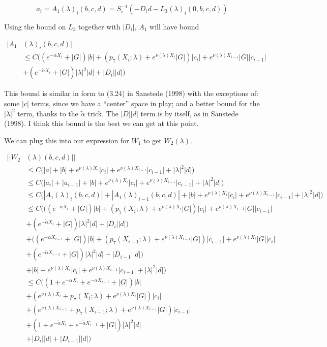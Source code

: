 \documentclass[12pt]{article}
\begin{document}
\begin{enumerate}
\[
a_i = A_1(\lambda)_i(b, c, d) = S_i^{-1}(-D_i d - L_3(\lambda)_i(0, b, c, d))
\]

Using the bound on $L_3$ together with $|D_i|$, $A_1$ will have bound

\begin{align*}
|A_1&(\lambda)_i(b, c, d)| \\
&\leq C \Big( (e^{-\alpha X_i} + |G|) |b| 
+ ( p_7(X_i; \lambda) + e^{\nu(\lambda)X_i} |G|) |c_i| + e^{\nu(\lambda)X_{i-1}} |G| |c_{i-1}| \\
&+ (e^{-\tilde{\alpha} X_i} + |G|) |\lambda|^2 |d| + |D_i||d| \Big)
\end{align*} 

This bound is similar in form to (3.24) in Sanstede (1998) with the exceptions of: some $|c|$ terms, since we have a ``center'' space in play; and a better bound for the $|\lambda|^2$ term, thanks to the $\tilde{\alpha}$ trick. The $|D| |d| $ term is by itself, as in Sanstede (1998). I think this bound is the best we can get at this point.

We can plug this into our expression for $W_1$ to get $W_2(\lambda)$.

\begin{align*}
||W_2&(\lambda)(b,c,d)|| \\
&\leq C \Big(|a| + |b| + e^{\nu(\lambda)X_i}|c_i| + e^{\nu(\lambda)X_{i-1}}|c_{i-1}| + |\lambda|^2 |d| \Big) \\
&\leq C \Big(|a_i| + |a_{i-1}| + |b| + e^{\nu(\lambda)X_i}|c_i| + e^{\nu(\lambda)X_{i-1}}|c_{i-1}| + |\lambda|^2 |d| \Big) \\
&\leq C \Big(|A_1(\lambda)_i(b,c,d)| + |A_1(\lambda)_{i-1}(b,c,d)| + |b| + e^{\nu(\lambda)X_i}|c_i| + e^{\nu(\lambda)X_{i-1}}|c_{i-1}| + |\lambda|^2 |d| \Big) \\
&\leq C \Big( ((e^{-\alpha X_i} + |G|) |b| 
+ ( p_7(X_i; \lambda) + e^{\nu(\lambda)X_i} |G|) |c_i| + e^{\nu(\lambda)X_{i-1}} |G| |c_{i-1}| \\
&+ (e^{-\tilde{\alpha} X_i} + |G|) |\lambda|^2 |d| + |D_i||d| )\\
&+ ((e^{-\alpha X_{i-1}} + |G|) |b| 
+ ( p_7(X_{i-1}; \lambda) + e^{\nu(\lambda)X_{i-1}} |G|) |c_{i-1}| + e^{\nu(\lambda)X_i} |G| |c_i| \\
&+ (e^{-\tilde{\alpha} X_{i-1}} + |G|) |\lambda|^2 |d| + |D_{i-1}||d| )\\
&+ |b| + e^{\nu(\lambda)X_i}|c_i| + e^{\nu(\lambda)X_{i-1}}|c_{i-1}| + |\lambda|^2 |d| \Big) \\
&\leq C \Big( (1 + e^{-\alpha X_i} + e^{-\alpha X_{i-1}} + |G|)|b|\\
&+ ( e^{\nu(\lambda)X_i} + p_7(X_i; \lambda) + e^{\nu(\lambda)X_i} |G| ) |c_i| \\
&+ ( e^{\nu(\lambda)X_{i-1}} + p_7(X_{i-1}; \lambda) + e^{\nu(\lambda)X_{i-1}} |G|) |c_{i-1}| \\ 
&+ (1 + e^{-\tilde{\alpha} X_i} + e^{-\tilde{\alpha} X_{i-1}} + |G|)|\lambda|^2 |d| \\
&+ |D_i||d| + |D_{i-1}||d|
\Big)
\end{align*}


\end{enumerate}
\end{document}
